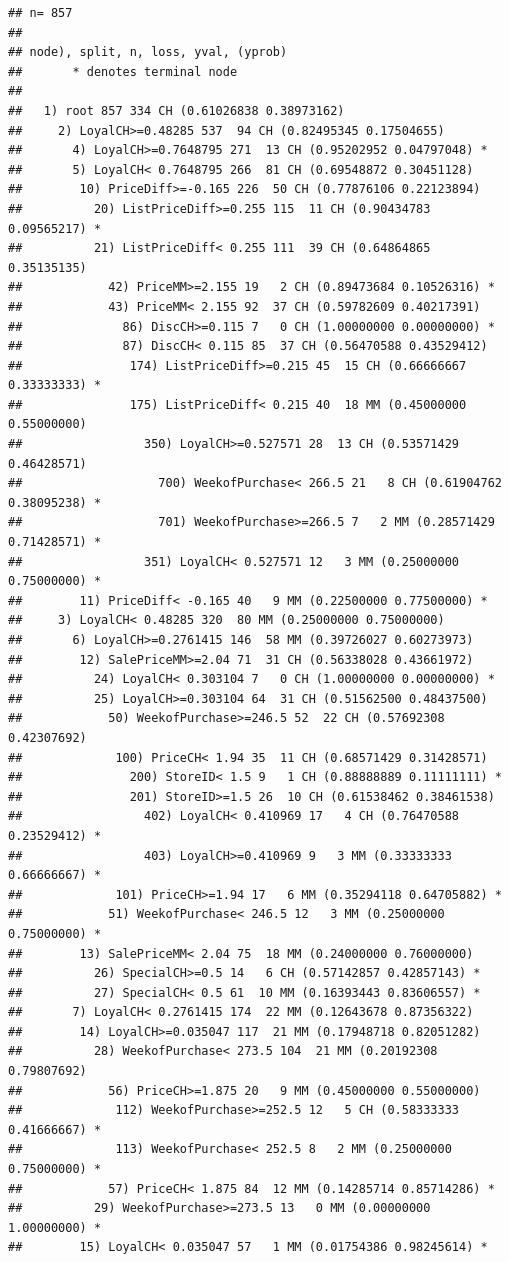 \documentclass[]{book}
\begin{document}
\begin{verbatim}
## n= 857 
## 
## node), split, n, loss, yval, (yprob)
##       * denotes terminal node
## 
##   1) root 857 334 CH (0.61026838 0.38973162)  
##     2) LoyalCH>=0.48285 537  94 CH (0.82495345 0.17504655)  
##       4) LoyalCH>=0.7648795 271  13 CH (0.95202952 0.04797048) *
##       5) LoyalCH< 0.7648795 266  81 CH (0.69548872 0.30451128)  
##        10) PriceDiff>=-0.165 226  50 CH (0.77876106 0.22123894)  
##          20) ListPriceDiff>=0.255 115  11 CH (0.90434783 0.09565217) *
##          21) ListPriceDiff< 0.255 111  39 CH (0.64864865 0.35135135)  
##            42) PriceMM>=2.155 19   2 CH (0.89473684 0.10526316) *
##            43) PriceMM< 2.155 92  37 CH (0.59782609 0.40217391)  
##              86) DiscCH>=0.115 7   0 CH (1.00000000 0.00000000) *
##              87) DiscCH< 0.115 85  37 CH (0.56470588 0.43529412)  
##               174) ListPriceDiff>=0.215 45  15 CH (0.66666667 0.33333333) *
##               175) ListPriceDiff< 0.215 40  18 MM (0.45000000 0.55000000)  
##                 350) LoyalCH>=0.527571 28  13 CH (0.53571429 0.46428571)  
##                   700) WeekofPurchase< 266.5 21   8 CH (0.61904762 0.38095238) *
##                   701) WeekofPurchase>=266.5 7   2 MM (0.28571429 0.71428571) *
##                 351) LoyalCH< 0.527571 12   3 MM (0.25000000 0.75000000) *
##        11) PriceDiff< -0.165 40   9 MM (0.22500000 0.77500000) *
##     3) LoyalCH< 0.48285 320  80 MM (0.25000000 0.75000000)  
##       6) LoyalCH>=0.2761415 146  58 MM (0.39726027 0.60273973)  
##        12) SalePriceMM>=2.04 71  31 CH (0.56338028 0.43661972)  
##          24) LoyalCH< 0.303104 7   0 CH (1.00000000 0.00000000) *
##          25) LoyalCH>=0.303104 64  31 CH (0.51562500 0.48437500)  
##            50) WeekofPurchase>=246.5 52  22 CH (0.57692308 0.42307692)  
##             100) PriceCH< 1.94 35  11 CH (0.68571429 0.31428571)  
##               200) StoreID< 1.5 9   1 CH (0.88888889 0.11111111) *
##               201) StoreID>=1.5 26  10 CH (0.61538462 0.38461538)  
##                 402) LoyalCH< 0.410969 17   4 CH (0.76470588 0.23529412) *
##                 403) LoyalCH>=0.410969 9   3 MM (0.33333333 0.66666667) *
##             101) PriceCH>=1.94 17   6 MM (0.35294118 0.64705882) *
##            51) WeekofPurchase< 246.5 12   3 MM (0.25000000 0.75000000) *
##        13) SalePriceMM< 2.04 75  18 MM (0.24000000 0.76000000)  
##          26) SpecialCH>=0.5 14   6 CH (0.57142857 0.42857143) *
##          27) SpecialCH< 0.5 61  10 MM (0.16393443 0.83606557) *
##       7) LoyalCH< 0.2761415 174  22 MM (0.12643678 0.87356322)  
##        14) LoyalCH>=0.035047 117  21 MM (0.17948718 0.82051282)  
##          28) WeekofPurchase< 273.5 104  21 MM (0.20192308 0.79807692)  
##            56) PriceCH>=1.875 20   9 MM (0.45000000 0.55000000)  
##             112) WeekofPurchase>=252.5 12   5 CH (0.58333333 0.41666667) *
##             113) WeekofPurchase< 252.5 8   2 MM (0.25000000 0.75000000) *
##            57) PriceCH< 1.875 84  12 MM (0.14285714 0.85714286) *
##          29) WeekofPurchase>=273.5 13   0 MM (0.00000000 1.00000000) *
##        15) LoyalCH< 0.035047 57   1 MM (0.01754386 0.98245614) *
\end{verbatim}
\end{document}
